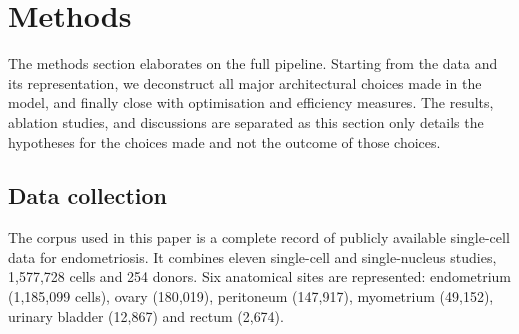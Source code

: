 %
%
%
%
%

\section*{Methods}

The methods section elaborates on the full \elaj pipeline. Starting from 
the data and its representation, we deconstruct all major architectural 
choices made in the model, and finally close with optimisation and 
efficiency measures. The results, ablation studies, and discussions are 
separated as this section only details the hypotheses for the choices made 
and not the outcome of those choices.


\subsection*{Data collection}

The corpus used in this paper is a complete record of publicly 
available single-cell data for endometriosis. It combines eleven
single-cell and single-nucleus studies, 1{,}577{,}728 cells and 254 donors.
Six anatomical sites are represented: endometrium (1{,}185{,}099 cells),
ovary (180{,}019), peritoneum (147{,}917), myometrium (49{,}152), urinary
bladder (12{,}867) and rectum (2{,}674).

